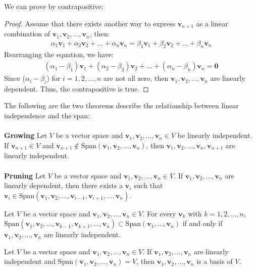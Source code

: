 \documentclass[11pt]{article}
\begin{document}
We can prove by contrapositive:
\begin{proof}
    Assume that there exists another way to express $\textbf{v}_{n+1}$ as a linear combination of $\textbf{v}_1, \textbf{v}_2, \ldots, \textbf{v}_n$, then:
    \begin{align*}
        \alpha_1 \textbf{v}_1 + \alpha_2 \textbf{v}_2 + \ldots + \alpha_n \textbf{v}_n = \beta_1 \textbf{v}_1 + \beta_2 \textbf{v}_2 + \ldots + \beta_n \textbf{v}_n
    \end{align*}
    Rearranging the equation, we have:
    \begin{align*}
        (\alpha_1 - \beta_1) \textbf{v}_1 + (\alpha_2 - \beta_2) \textbf{v}_2 + \ldots + (\alpha_n - \beta_n) \textbf{v}_n = \textbf{0}
    \end{align*}
    Since ($\alpha_i - \beta_i$) for $i = 1, 2, \ldots, n$ are not all zero, then $\textbf{v}_1, \textbf{v}_2, \ldots, \textbf{v}_n$ are linearly dependent. Thus, the contrapositive is true.
\end{proof}
\begin{theorem} The following are the two theorems describe the relationship between linear independence and the span: \\ \\
    \textbf{Growing} Let $V$ be a vector space and $\textbf{v}_1, \textbf{v}_2, \ldots, \textbf{v}_n \in V$ be linearly independent. If $\textbf{v}_{n+1} \in V$ and $\textbf{v}_{n+1} \notin \text{Span}(\textbf{v}_1, \textbf{v}_2, \ldots, \textbf{v}_n)$, then $\textbf{v}_1, \textbf{v}_2, \ldots, \textbf{v}_n, \textbf{v}_{n+1}$ are linearly independent. \\ \\
    \textbf{Pruning} Let $V$ be a vector space and $\textbf{v}_1, \textbf{v}_2, \ldots, \textbf{v}_n \in V$. If $\textbf{v}_1, \textbf{v}_2, \ldots, \textbf{v}_n$ are linearly dependent, then there exists a $\textbf{v}_i$ such that $\textbf{v}_i \in \text{Span}(\textbf{v}_1, \textbf{v}_2, \ldots, \textbf{v}_{i-1}, \textbf{v}_{i+1}, \ldots, \textbf{v}_n)$.
\end{theorem}
\begin{theorem}
    Let $V$ be a vector space and $\textbf{v}_1, \textbf{v}_2, \ldots, \textbf{v}_n \in V$. For every $\textbf{v}_k$ with $k = 1, 2, \ldots, n$, $\text{Span}(\textbf{v}_1, \textbf{v}_2, \ldots, \textbf{v}_{k-1}, \textbf{v}_{k+1}, \ldots, \textbf{v}_n) \subset \text{Span}(\textbf{v}_1, \ldots, \textbf{v}_n)$ if and only if $\textbf{v}_1, \textbf{v}_2, \ldots, \textbf{v}_n$ are linearly independent.
\end{theorem}
\begin{definition}[Basis]
    Let $V$ be a vector space and $\textbf{v}_1, \textbf{v}_2, \ldots, \textbf{v}_n \in V$. If $\textbf{v}_1, \textbf{v}_2, \ldots, \textbf{v}_n$ are linearly independent and $\text{Span}(\textbf{v}_1, \textbf{v}_2, \ldots, \textbf{v}_n) = V$, then $\textbf{v}_1, \textbf{v}_2, \ldots, \textbf{v}_n$ is a basis of $V$.
\end{definition}
\end{document}
